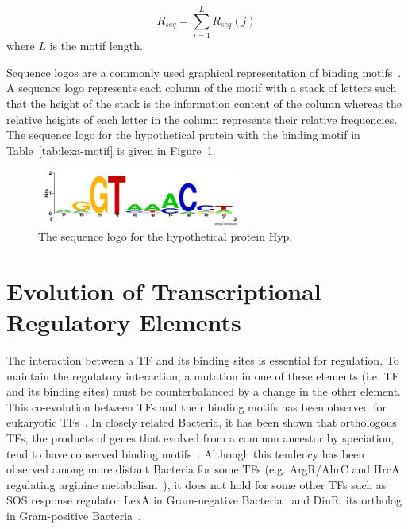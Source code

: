 \begin{equation}
  \label{eq:1}
  R_{seq} = \displaystyle\sum_{i=1}^L R_{seq}(j)
\end{equation}
where $L$ is the motif length.

Sequence logos are a commonly used graphical representation of binding
motifs~\cite{schneider1990sequence, crooks2004weblogo}. A sequence logo
represents each column of the motif with a stack of letters such that the
height of the stack is the information content of the column whereas the
relative heights of each letter in the column represents their relative
frequencies. The sequence logo for the hypothetical protein with the binding
motif in Table~\ref{tab:lexa-motif} is given in Figure~\ref{fig:lexa}.

\begin{figure}
  \centering
  \includegraphics[width=0.6\textwidth]{figures/chapter1/hyp.png}
  \caption{The sequence logo for the hypothetical protein Hyp.}
  \label{fig:lexa}
\end{figure}

\section{Evolution of Transcriptional Regulatory Elements}

The interaction between a TF and its binding sites is essential for
regulation. To maintain the regulatory interaction, a mutation in one of these
elements (i.e. TF and its binding sites) must be counterbalanced by a change in
the other element. This co-evolution between TFs and their binding motifs has
been observed for eukaryotic TFs~\cite{yang2011correlated}. In closely related
Bacteria, it has been shown that orthologous TFs, the products of genes that
evolved from a common ancestor by speciation, tend to have conserved binding
motifs~\cite{makarova2001conservation}. Although this tendency has been
observed among more distant Bacteria for some TFs (e.g. ArgR/AhrC and HrcA
regulating arginine metabolism~\cite{maas1994arginine, klingel1995binding}), it
does not hold for some other TFs such as SOS response regulator LexA in
Gram-negative Bacteria~\cite{walker1985inducible} and DinR, its ortholog in
Gram-positive Bacteria~\cite{winterling1998bacillus}.

